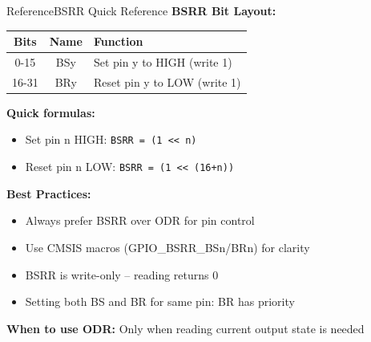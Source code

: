 \documentclass{beamer}
\begin{document}
\begin{frame}{Reference}{BSRR Quick Reference}
	\textbf{BSRR Bit Layout:}
	\begin{center}
		\small
		\begin{tabular}{|c|c|l|}
			\hline
			\textbf{Bits} & \textbf{Name} & \textbf{Function} \\ \hline
			0-15 & BSy & Set pin y to HIGH (write 1) \\ \hline
			16-31 & BRy & Reset pin y to LOW (write 1) \\ \hline
		\end{tabular}
	\end{center}
	
	\medskip
	\textbf{Quick formulas:}
	\begin{itemize}
		\item Set pin n HIGH: \texttt{BSRR = (1 << n)}
		\item Reset pin n LOW: \texttt{BSRR = (1 << (16+n))}
	\end{itemize}
	
	\medskip
	\textbf{Best Practices:}
	\begin{itemize}
		\item Always prefer BSRR over ODR for pin control
		\item Use CMSIS macros (GPIO\_BSRR\_BSn/BRn) for clarity
		\item BSRR is write-only – reading returns 0
		\item Setting both BS and BR for same pin: BR has priority
	\end{itemize}
	
	\medskip
	\textbf{When to use ODR:} Only when reading current output state is needed
\end{frame}
\end{document}
